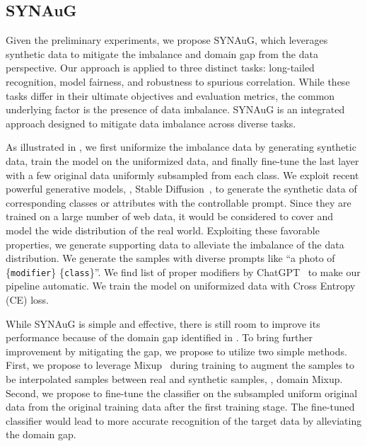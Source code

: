 \subsection{SYNAuG}\label{sec:2.2}
Given the preliminary experiments, we propose SYNAuG, which leverages synthetic data to mitigate the imbalance and domain gap from the data perspective.
Our approach is applied to 
three distinct tasks: long-tailed recognition, model fairness, and robustness to spurious correlation.
While these tasks differ in their ultimate objectives and evaluation metrics, the common underlying factor is the presence of data imbalance.
SYNAuG is an integrated approach designed to mitigate data imbalance across diverse tasks.

As illustrated in , we first uniformize the imbalance data by generating synthetic data, train the model on the uniformized data, and finally fine-tune the last layer with a few original data uniformly subsampled from each class.
We exploit recent powerful generative models, \eg, Stable Diffusion~\cite{rombach2022high}, to generate the synthetic data of corresponding classes or attributes with the controllable prompt.
Since they are trained on a large number of web data, it would be considered to cover and model the wide distribution of the real world.
Exploiting these favorable properties, we generate supporting data to alleviate the imbalance of the data distribution.
We generate the samples with diverse prompts like ``a photo of \{\texttt{modifier}\} \{\texttt{class}\}''.
We find list of proper modifiers by ChatGPT~\cite{ouyang2022training} to make our pipeline automatic.
We train the model on uniformized data with Cross Entropy (CE) loss.

While SYNAuG is simple and effective, there is still room to improve its performance because of the domain gap identified 
in .
To bring further improvement by mitigating the gap, we propose to utilize two simple methods.
First, we propose to leverage
Mixup~\cite{zhang2017mixup} during training to augment the samples to be interpolated samples between real and synthetic samples, \ie, domain Mixup.
Second, we propose to fine-tune the classifier on the subsampled uniform original data from the original training data after the first training stage.
The fine-tuned classifier would lead to more accurate recognition of the target data by alleviating the domain gap.

